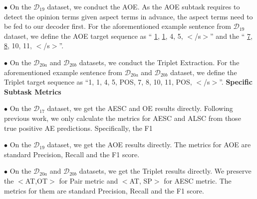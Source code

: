 \documentclass[11pt,a4paper]{article}
\begin{document}
$\bullet$  On the \emph{$\mathcal{D}_{19}$} dataset, we conduct the AOE. As the AOE subtask requires to detect the opinion terms given aspect  terms in advance, the aspect terms need to be fed to our decoder first. For the aforementioned example sentence from \emph{$\mathcal{D}_{19}$} dataset, we define the AOE target sequence as `` \underline{1}, \underline{1}, 4, 5, $<$/s$>$'' and the `` \underline{7}, \underline{8}, 10, 11, $<$/s$>$''.

$\bullet$ On the \emph{$\mathcal{D}_{20a}$} and \emph{$\mathcal{D}_{20b}$} datasets, we conduct the Triplet Extraction. For the aforementioned example sentence from \emph{$\mathcal{D}_{20a}$} and \emph{$\mathcal{D}_{20b}$} dataset, we define the Triplet target sequence as ``1, 1, 4, 5, POS, 7, 8, 10, 11, POS, $<$/s$>$''.\newline
\textbf{Specific Subtask Metrics}

$\bullet$ On the \emph{$\mathcal{D}_{17}$} dataset, we get the AESC and OE results directly. Following previous work, we only calculate the metrics for AESC and ALSC from those true positive AE predictions.  Specifically, the F1 

$\bullet$ On the \emph{$\mathcal{D}_{19}$} dataset, we get the AOE results directly. The metrics for AOE are standard Precision, Recall and the F1 score.

$\bullet$ On the \emph{$\mathcal{D}_{20a}$} and \emph{$\mathcal{D}_{20b}$} datasets, we get the Triplet results directly.  We preserve the $<$AT,OT$>$ for Pair metric and $<$AT, SP$>$ for AESC metric. The metrics for them are standard Precision, Recall and the F1 score.
\end{document}
